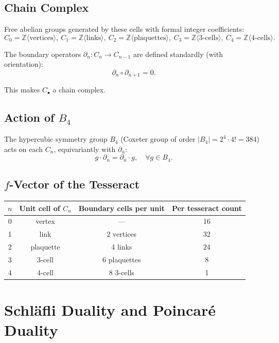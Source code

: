 \documentclass[a4paper,11pt]{article}
\begin{document}
\subsection{Chain Complex}

Free abelian groups generated by these cells with formal integer coefficients:
\[ C_0 = \mathbb{Z}\langle\text{vertices}\rangle, \ C_1 = \mathbb{Z}\langle\text{links}\rangle, \ C_2 = \mathbb{Z}\langle\text{plaquettes}\rangle, \ C_3 = \mathbb{Z}\langle\text{3-cells}\rangle, \ C_4 = \mathbb{Z}\langle\text{4-cells}\rangle. \]

The boundary operators $\partial_n : C_n \to C_{n-1}$ are defined standardly (with orientation):
\begin{equation}
\partial_n \circ \partial_{n+1} = 0. \tag{2.1}
\end{equation}

This makes $C_\bullet$ a chain complex.

\subsection{Action of $B_4$}

The hypercubic symmetry group $B_4$ (Coxeter group of order $|B_4| = 2^4 \cdot 4! = 384$) acts on each $C_n$, equivariantly with $\partial_n$:
\begin{equation}
g \cdot \partial_n = \partial_n \cdot g, \quad \forall g \in B_4. \tag{2.2}
\end{equation}

\subsection{$f$-Vector of the Tesseract}

\begin{center}
\begin{tabular}{cccc}
\toprule
$n$ & Unit cell of $C_n$ & Boundary cells per unit & Per tesseract count \\
\midrule
0 & vertex & --- & 16 \\
1 & link & 2 vertices & 32 \\
2 & plaquette & 4 links & 24 \\
3 & 3-cell & 6 plaquettes & 8 \\
4 & 4-cell & 8 3-cells & 1 \\
\bottomrule
\end{tabular}
\end{center}

\section{Schl\"afli Duality and Poincar\'e Duality}
\end{document}
